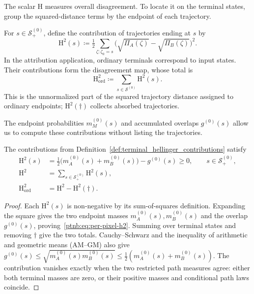 The scalar $\mathrm H$ measures overall disagreement. To locate it on the terminal states, group the squared-distance terms by the endpoint of each trajectory.
\begin{definition}\label{def:terminal_hellinger_contributions}
For $s\in\mathcal S_+^{(0)}$, define the contribution of trajectories ending at $s$ by
\[
 \mathrm H^2(s)\coloneqq\tfrac12\sum_{\zeta:\zeta_0=s}
 \bigl(\sqrt{\Pi_A(\zeta)}-\sqrt{\Pi_B(\zeta)}\bigr)^2.
\]
In the attribution application, ordinary terminals correspond to input states. Their contributions form the disagreement map, whose total is
\[
 \mathrm H_{\mathrm{ord}}^2\coloneqq\sum_{s\in\mathcal S^{(0)}}\mathrm H^2(s).
\]
This is the unnormalized part of the squared trajectory distance assigned to ordinary endpoints; $\mathrm H^2(\dagger)$ collects absorbed trajectories.
\end{definition}

The endpoint probabilities $m_M^{(0)}(s)$ and accumulated overlaps $g^{(0)}(s)$ allow us to compute these contributions without listing the trajectories.

\begin{theoremenv}\label{ptnb:thm:per-pixel}
The contributions from Definition~\ref{def:terminal_hellinger_contributions} satisfy
\begin{align}
 \mathrm H^2(s)&=\tfrac12\bigl(m_A^{(0)}(s)+m_B^{(0)}(s)\bigr)-g^{(0)}(s)\ge0,
 \qquad s\in\mathcal S_+^{(0)},\label{ptnb:eq:per-pixel-h2}\\
 \mathrm H^2&=\sum_{s\in\mathcal S_+^{(0)}}\mathrm H^2(s),\label{ptnb:eq:per-pixel-sum}\\
 \mathrm H^2_{\mathrm{ord}}&=\mathrm H^2-\mathrm H^2(\dagger).\label{ptnb:eq:ordinary-h2}
\end{align}
\end{theoremenv}

\begin{proof}
Each $\mathrm H^2(s)$ is non-negative by its sum-of-squares definition. Expanding the square gives the two endpoint masses $m_A^{(0)}(s),m_B^{(0)}(s)$ and the overlap $g^{(0)}(s)$, proving~\eqref{ptnb:eq:per-pixel-h2}. Summing over terminal states and removing $\dagger$ give the two totals. Cauchy--Schwarz and the inequality of arithmetic and geometric means (AM--GM) also give
$g^{(0)}(s)\le\sqrt{m_A^{(0)}(s)m_B^{(0)}(s)}\le\tfrac12(m_A^{(0)}(s)+m_B^{(0)}(s))$.
The contribution vanishes exactly when the two restricted path measures agree: either both terminal masses are zero, or their positive masses and conditional path laws coincide.
\end{proof}


